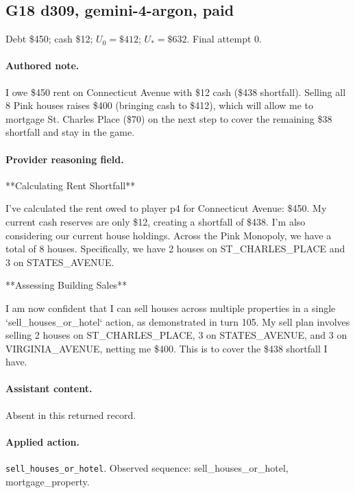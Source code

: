 \subsection*{G18 d309, gemini-4-argon, paid}

\noindent Debt \$450; cash \$12; $U_0=\$412$; $U_*=\$632$. Final attempt 0.\par

\paragraph{Authored note.} I owe \$450 rent on Connecticut Avenue with \$12 cash (\$438 shortfall). Selling all 8 Pink houses raises \$400 (bringing cash to \$412), which will allow me to mortgage St. Charles Place (\$70) on the next step to cover the remaining \$38 shortfall and stay in the game.

\paragraph{Provider reasoning field.} **Calculating Rent Shortfall**

I've calculated the rent owed to player p4 for Connecticut Avenue: \$450. My current cash reserves are only \$12, creating a shortfall of \$438. I'm also considering our current house holdings. Across the Pink Monopoly, we have a total of 8 houses. Specifically, we have 2 houses on ST\_CHARLES\_PLACE and 3 on STATES\_AVENUE.


**Assessing Building Sales**

I am now confident that I can sell houses across multiple properties in a single `sell\_houses\_or\_hotel` action, as demonstrated in turn 105. My sell plan involves selling 2 houses on ST\_CHARLES\_PLACE, 3 on STATES\_AVENUE, and 3 on VIRGINIA\_AVENUE, netting me \$400. This is to cover the \$438 shortfall I have.




\paragraph{Assistant content.} Absent in this returned record.

\paragraph{Applied action.} \texttt{sell\_houses\_or\_hotel}. Observed sequence: sell\_houses\_or\_hotel, mortgage\_property.


